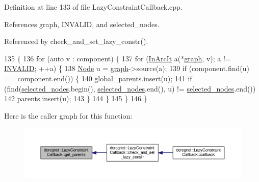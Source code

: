 Definition at line 133 of file Lazy\+Constraint\+Callback.\+cpp.



References graph, I\+N\+V\+A\+L\+ID, and selected\+\_\+nodes.



Referenced by check\+\_\+and\+\_\+set\+\_\+lazy\+\_\+constr().


\begin{DoxyCode}
135                                                                        \{
136     \textcolor{keywordflow}{for} (\textcolor{keyword}{auto} v : component) \{
137         \textcolor{keywordflow}{for} (\hyperlink{namespacederegnet_aed58be361aeda4ef7a9eaca2731ba830}{InArcIt} a(*\hyperlink{classderegnet_1_1LazyConstraintCallback_af481c9d68dea2dab035e1f2f79cda4d5}{graph}, v); a != \hyperlink{usinglemon_8h_adf770fe2eec438e3758ffe905dbae208}{INVALID}; ++a) \{
138             \hyperlink{namespacederegnet_a744bad34f2de9856d36715a445f027f3}{Node} u = \hyperlink{classderegnet_1_1LazyConstraintCallback_af481c9d68dea2dab035e1f2f79cda4d5}{graph}->source(a);
139             \textcolor{keywordflow}{if} (component.find(u) == component.end()) \{
140                 global\_parents.insert(u);
141                 \textcolor{keywordflow}{if} (find(\hyperlink{classderegnet_1_1LazyConstraintCallback_a5ddc4662e6e5c9f1d191c15edbefaa9b}{selected\_nodes}.begin(), \hyperlink{classderegnet_1_1LazyConstraintCallback_a5ddc4662e6e5c9f1d191c15edbefaa9b}{selected\_nodes}.end(), u) != 
      \hyperlink{classderegnet_1_1LazyConstraintCallback_a5ddc4662e6e5c9f1d191c15edbefaa9b}{selected\_nodes}.end())
142                     parents.insert(u);
143             \}
144         \}
145     \}
146 \}
\end{DoxyCode}


Here is the caller graph for this function\+:\nopagebreak
\begin{figure}[H]
\begin{center}
\leavevmode
\includegraphics[width=350pt]{classderegnet_1_1LazyConstraintCallback_ab1357c9415e190aaa56ed87022ec0b82_icgraph}
\end{center}
\end{figure}


